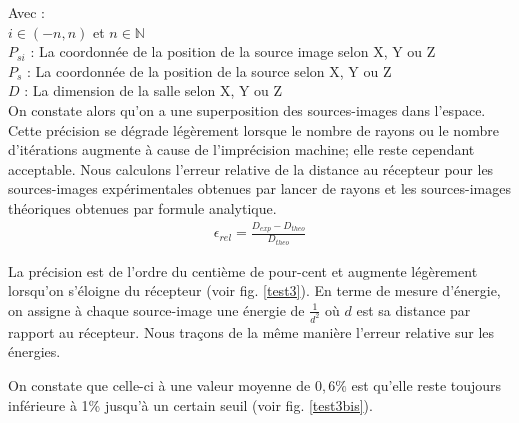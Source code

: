 Avec : \\
$i \in (-n, n)$ et $n \in \mathbb{N}$ \\
$P_{si}$ : La coordonnée de la position de la source image selon X, Y ou Z \\
$P_s$ : La coordonnée de la position de la source selon X, Y ou Z \\
$D$ : La dimension de la salle selon X, Y ou Z \\

On constate alors qu'on a une superposition des sources-images dans l'espace. Cette précision se dégrade légèrement lorsque le nombre de rayons ou le nombre d'itérations augmente à cause de l'imprécision machine; elle reste cependant acceptable. Nous calculons l'erreur relative de la distance au récepteur pour les sources-images expérimentales obtenues par lancer de rayons et les sources-images théoriques obtenues par formule analytique.
\begin{align}
\epsilon_{rel} = \frac{D_{exp}-D_{theo}}{D_{theo}}
\end{align}

La précision est de l'ordre du centième de pour-cent et augmente légèrement lorsqu'on s'éloigne du récepteur (voir fig. \ref{test3}).
En terme de mesure d'énergie, on assigne à chaque source-image une énergie de $\frac{1}{d^2}$ où $d$ est sa distance par rapport au récepteur. Nous traçons de la même manière l'erreur relative sur les énergies.


On constate que celle-ci à une valeur moyenne de $0,6\%$ est qu'elle reste toujours inférieure à 1\% jusqu'à un certain seuil (voir fig. \ref{test3bis}).

